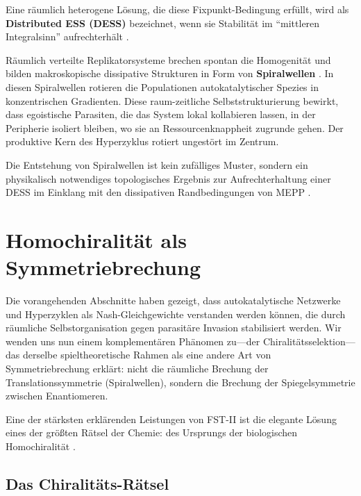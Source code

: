 \documentclass[12pt,a4paper]{article}
\theoremstyle{remark}
\begin{document}
Eine r\"aumlich heterogene L\"osung, die diese Fixpunkt-Bedingung erf\"ullt, wird als \textbf{Distributed ESS (DESS)} bezeichnet, wenn sie Stabilit\"at im ``mittleren Integralsinn'' aufrechterh\"alt \citep{ReplicatorDiffusion}.

R\"aumlich verteilte Replikatorsysteme brechen spontan die Homogenit\"at und bilden makroskopische dissipative Strukturen in Form von \textbf{Spiralwellen} \citep{SpiralWaves}. In diesen Spiralwellen rotieren die Populationen autokatalytischer Spezies in konzentrischen Gradienten. Diese raum-zeitliche Selbststrukturierung bewirkt, dass egoistische Parasiten, die das System lokal kollabieren lassen, in der Peripherie isoliert bleiben, wo sie an Ressourcenknappheit zugrunde gehen. Der produktive Kern des Hyperzyklus rotiert ungest\"ort im Zentrum.

Die Entstehung von Spiralwellen ist kein zuf\"alliges Muster, sondern ein physikalisch notwendiges topologisches Ergebnis zur Aufrechterhaltung einer DESS im Einklang mit den dissipativen Randbedingungen von MEPP \citep{HypercycleInfinite}.

\section{Homochiralit\"at als Symmetriebrechung}
\label{sec:chirality}

Die vorangehenden Abschnitte haben gezeigt, dass autokatalytische Netzwerke und Hyperzyklen als Nash-Gleichgewichte verstanden werden k\"onnen, die durch r\"aumliche Selbstorganisation gegen parasit\"are Invasion stabilisiert werden. Wir wenden uns nun einem komplement\"aren Ph\"anomen zu---der Chiralit\"atsselektion---das derselbe spieltheoretische Rahmen als eine andere Art von Symmetriebrechung erkl\"art: nicht die r\"aumliche Brechung der Translationssymmetrie (Spiralwellen), sondern die Brechung der Spiegelsymmetrie zwischen Enantiomeren.

Eine der st\"arksten erkl\"arenden Leistungen von FST-II ist die elegante L\"osung eines der gr\"o\ss{}ten R\"atsel der Chemie: des Ursprungs der biologischen Homochiralit\"at \citep{Biochirality}.

\subsection{Das Chiralit\"ats-R\"atsel}
\end{document}
